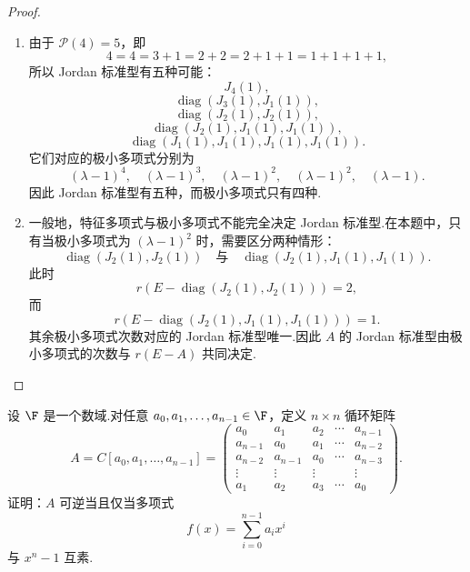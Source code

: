 \begin{proof}
	\begin{enumerate}
		\item 由于 $\mathcal{P}(4)=5$，即
		\[
		4=4=3+1=2+2=2+1+1=1+1+1+1,
		\]
		所以 Jordan 标准型有五种可能：
		\[
		J_4(1),
		\]
		\[
		\operatorname{diag}(J_3(1),J_1(1)),
		\]
		\[
		\operatorname{diag}(J_2(1),J_2(1)),
		\]
		\[
		\operatorname{diag}(J_2(1),J_1(1),J_1(1)),
		\]
		\[
		\operatorname{diag}(J_1(1),J_1(1),J_1(1),J_1(1)).
		\]
		它们对应的极小多项式分别为
		\[
		(\lambda-1)^4,
		\quad
		(\lambda-1)^3,
		\quad
		(\lambda-1)^2,
		\quad
		(\lambda-1)^2,
		\quad
		(\lambda-1).
		\]
		因此 Jordan 标准型有五种，而极小多项式只有四种.
		
		\item 一般地，特征多项式与极小多项式不能完全决定 Jordan 标准型.在本题中，只有当极小多项式为 $(\lambda-1)^2$ 时，需要区分两种情形：
		\[
		\operatorname{diag}(J_2(1),J_2(1))
		\quad\text{与}\quad
		\operatorname{diag}(J_2(1),J_1(1),J_1(1)).
		\]
		此时
		\[
		r(E-\operatorname{diag}(J_2(1),J_2(1)))=2,
		\]
		而
		\[
		r(E-\operatorname{diag}(J_2(1),J_1(1),J_1(1)))=1.
		\]
		其余极小多项式次数对应的 Jordan 标准型唯一.因此 $A$ 的 Jordan 标准型由极小多项式的次数与 $r(E-A)$ 共同决定.
	\end{enumerate}
\end{proof}

\begin{problem}[88]
	\label{p1:concept:c5-l3660}设 $\F$ 是一个数域.对任意 $a_0,a_1,\ldots,a_{n-1}\in\F$，定义 $n\times n$ 循环矩阵
	\[
	A=C[a_0,a_1,\ldots,a_{n-1}]
	=
	\begin{pmatrix}
		a_0&a_1&a_2&\cdots&a_{n-1}\\
		a_{n-1}&a_0&a_1&\cdots&a_{n-2}\\
		a_{n-2}&a_{n-1}&a_0&\cdots&a_{n-3}\\
		\vdots&\vdots&\vdots&&\vdots\\
		a_1&a_2&a_3&\cdots&a_0
	\end{pmatrix}.
	\]
	证明：$A$ 可逆当且仅当多项式
	\[
	f(x)=\sum_{i=0}^{n-1}a_ix^i
	\]
	与 $x^n-1$ 互素.
\end{problem}

